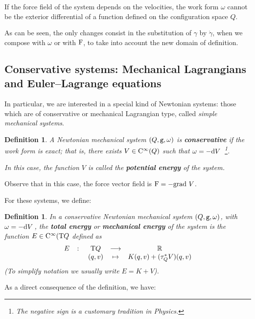\documentclass[12pt]{report}
\newtheorem{definition}[teor]{Definition}
\def\d{{\rm d}}
\def\Real{\mathbb{R}}
\def\Tan{{\rm T}}
\def\Cinfty{{\rm C}^\infty}
\begin{document}
 If the force field of the system depends on the velocities, the work form
 $\omega$ cannot be the exterior differential of a function defined on the configuration space $Q$.

As can be seen, the only changes consist in the substitution of
$\gamma$ by $\dot\gamma$, when we compose with $\omega$ or with ${\rm F}$,
to take into account the new domain of definition.


\subsection{Conservative systems:
Mechanical Lagrangians and Euler--Lagrange equations}


In particular, we are interested in a special kind of Newtonian systems:
those which are of conservative or mechanical Lagrangian type, called {\sl simple mechanical systems}.

\begin{definition}
A Newtonian mechanical system $(Q,{\tt g},\omega)$ is \textbf{conservative} if the work form is exact; that is, there exists $V\in\Cinfty (Q)$ such that $\omega =-\d V\,$
\footnote{
The negative sign is a customary tradition in Physics.
}.

In this case, the function $V$ is called the \textbf{potential energy} of the system.
\end{definition}

Observe that in this case, the force vector field is  ${\rm F}=-{\rm grad}\ V$.

For these systems, we define:

\begin{definition}
In a conservative Newtonian mechanical system $(Q,{\tt g},\omega)$, with $\omega =-\d V\,$,
the \textbf{total energy} or \textbf{mechanical energy} of the system 
is the function $E\in\Cinfty(\Tan Q$ defined as
$$
\begin{array}{ccccc}
E & \colon & \Tan Q & \longrightarrow & \Real  \\
& & (q,v) &\mapsto & K(q,v)+(\tau^*_QV)(q,v)
\end{array}
$$
(To simplify notation we usually write $E=K+V$).
\end{definition}

As a direct consequence of the definition, we have:
\end{document}
